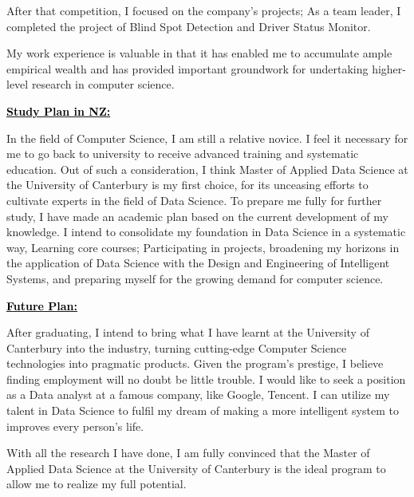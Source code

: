 \documentclass[12pt]{article}
\newcommand{\statement}[1]{\par\medskip
  \underline{\textcolor{black}{\textbf{#1:}}}\space
}
\begin{document}
\bigskip

After that competition, I focused on the company's projects; As a team leader, I completed the project of Blind Spot Detection and Driver Status Monitor.

\bigskip

My work experience is valuable in that it has enabled me to accumulate ample empirical wealth and has provided important groundwork for undertaking higher-level research in computer science.

\bigskip

\statement{Study Plan in NZ}
In the field of Computer Science, I am still a relative novice. I feel it necessary for me to go back to university to receive advanced training and systematic education. Out of such a consideration, I think Master of Applied Data Science at the University of Canterbury is my first choice, for its unceasing efforts to cultivate experts in the field of Data Science. To prepare me fully for further study, I have made an academic plan based on the current development of my knowledge. I intend to consolidate my foundation in Data Science in a systematic way, Learning core courses; Participating in projects, broadening my horizons in the application of Data Science with the Design and Engineering of Intelligent Systems, and preparing myself for the growing demand for computer science. 

\bigskip

\statement{Future Plan}
After graduating, I intend to bring what I have learnt at the University of Canterbury into the industry, turning cutting-edge Computer Science technologies into pragmatic products. Given the program's prestige, I believe finding employment will no doubt be little trouble. I would like to seek a position as a Data analyst at a famous company, like Google, Tencent. I can utilize my talent in Data Science to fulfil my dream of making a more intelligent system to improves every person's life.

\bigskip

With all the research I have done, I am fully convinced that the Master of Applied Data Science at the University of Canterbury is the ideal program to allow me to realize my full potential.
\end{document}
